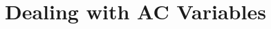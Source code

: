 \documentclass[11pt,a4paper,twoside]{article}
\newcommand{\+}{\discretionary{\mbox{\scriptsize$\hookleftarrow$}}{}{}}
\begin{document}
\begin{comment}
\MHAtitle{Getting Started}
\newpage
\MHAcopyright{}
\newpage
\tableofcontents
\newpage
\end{comment}


\begin{comment}
windows --interactive mode?

\end{comment}







\section{Dealing with AC Variables}
\label{sec:freqshifter}

\end{document}

